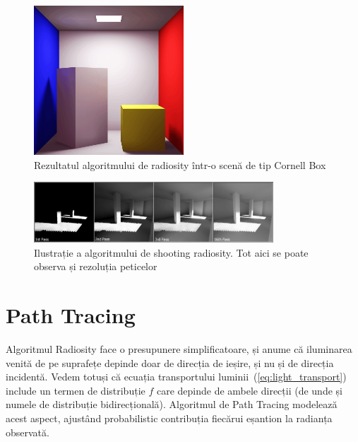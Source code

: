 \documentclass[12pt,a4paper]{report}
\numberwithin{equation}{section} %
\begin{document}
\begin{figure}[ht]
	\centering
	\includegraphics[width=0.5\textwidth]{pics/radiosity.png}
	\caption{Rezultatul algoritmului de radiosity într-o scenă de tip Cornell Box\protect{}}
	\label{fig:radiosity}
\end{figure}
\begin{figure}[ht]
	\centering
	\includegraphics[width=0.8\textwidth]{pics/shooting_radiosity.png}
	\caption{Ilustrație a algoritmului de shooting radiosity. Tot aici se poate observa și rezoluția peticelor\protect{}}
	\label{fig:shooting_radiosity}
\end{figure}

\section{Path Tracing}\label{sec:path_tracing}

Algoritmul Radiosity face o presupunere simplificatoare, și anume că iluminarea
venită de pe suprafețe depinde doar de direcția de ieșire, și nu și de direcția
incidentă. Vedem totuși că ecuația transportului luminii~(\ref{eq:light_transport})
include un termen de distribuție $f$ care depinde de ambele direcții (de unde
și numele de distribuție bidirecțională). Algoritmul de Path Tracing modelează
acest aspect, ajustând probabilistic contribuția fiecărui eșantion la radianța
observată.
\end{document}
